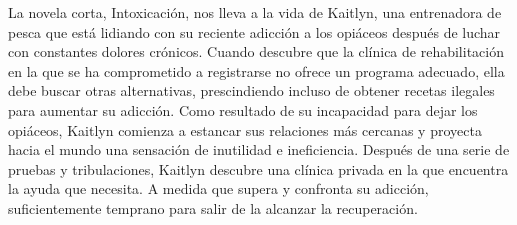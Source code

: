 
La novela corta, Intoxicación, nos lleva a la vida de Kaitlyn, una entrenadora de pesca que está lidiando con su reciente adicción a los opiáceos después de luchar con constantes dolores crónicos. Cuando descubre que la clínica de rehabilitación en la que se ha comprometido a registrarse no ofrece un programa adecuado, ella debe buscar otras alternativas, prescindiendo incluso de obtener recetas ilegales para aumentar su adicción. Como resultado de su incapacidad para dejar los opiáceos, Kaitlyn comienza a estancar sus relaciones más cercanas y proyecta hacia el mundo una sensación de inutilidad e ineficiencia. Después de una serie de pruebas y tribulaciones, Kaitlyn descubre una clínica privada en la que encuentra la ayuda que necesita. A medida que supera y confronta su adicción, suficientemente temprano para salir de la alcanzar la recuperación.